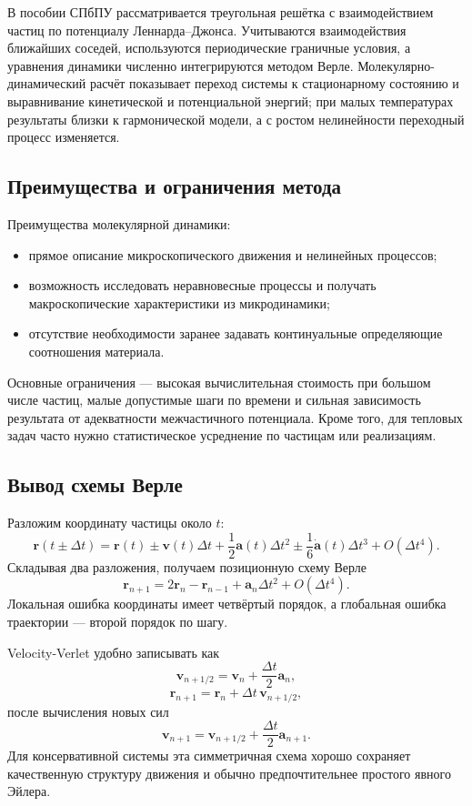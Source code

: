 В пособии СПбПУ рассматривается треугольная решётка с взаимодействием
частиц по потенциалу Леннарда--Джонса. Учитываются взаимодействия
ближайших соседей, используются периодические граничные условия, а уравнения
динамики численно интегрируются методом Верле. Молекулярно-динамический расчёт
показывает переход системы к стационарному состоянию и выравнивание
кинетической и потенциальной энергий; при малых температурах результаты близки
к гармонической модели, а с ростом нелинейности переходный процесс изменяется.

\subsection{Преимущества и ограничения метода}

Преимущества молекулярной динамики:
\begin{itemize}
    \item прямое описание микроскопического движения и нелинейных процессов;
    \item возможность исследовать неравновесные процессы и получать
    макроскопические характеристики из микродинамики;
    \item отсутствие необходимости заранее задавать континуальные
    определяющие соотношения материала.
\end{itemize}
Основные ограничения --- высокая вычислительная стоимость при большом числе
частиц, малые допустимые шаги по времени и сильная зависимость результата от
адекватности межчастичного потенциала. Кроме того, для тепловых задач часто
нужно статистическое усреднение по частицам или реализациям.


\subsection{Вывод схемы Верле}

Разложим координату частицы около $t$:
\[
\mathbf r(t\pm\Delta t)=\mathbf r(t)
\pm\mathbf v(t)\Delta t
+\frac12\mathbf a(t)\Delta t^2
\pm\frac16\dot{\mathbf a}(t)\Delta t^3+O(\Delta t^4).
\]
Складывая два разложения, получаем позиционную схему Верле
\[
\boxed{
\mathbf r_{n+1}=2\mathbf r_n-\mathbf r_{n-1}
+\mathbf a_n\Delta t^2+O(\Delta t^4).}
\]
Локальная ошибка координаты имеет четвёртый порядок, а глобальная ошибка
траектории --- второй порядок по шагу.

Velocity-Verlet удобно записывать как
\[
\mathbf v_{n+1/2}=\mathbf v_n+\frac{\Delta t}{2}\mathbf a_n,
\]
\[
\mathbf r_{n+1}=\mathbf r_n+\Delta t\,\mathbf v_{n+1/2},
\]
после вычисления новых сил
\[
\mathbf v_{n+1}=\mathbf v_{n+1/2}
+\frac{\Delta t}{2}\mathbf a_{n+1}.
\]
Для консервативной системы эта симметричная схема хорошо сохраняет качественную
структуру движения и обычно предпочтительнее простого явного Эйлера.

